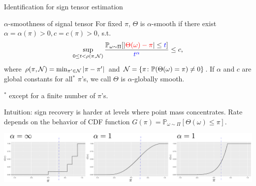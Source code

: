 \documentclass[10pt, mathserif]{beamer} %
\theoremstyle{definition}
\theoremstyle{plain}
\begin{document}
\begin{frame}{Identification for sign tensor estimation}
\begin{block}{$\alpha$-smoothness of signal tensor}
For fixed $\pi$, $\Theta$ is $\alpha$-smooth if there exist $\alpha = \alpha(\pi)>0,c = c(\pi)>0$, s.t.
\begin{align}
    \sup_{0\leq t<\rho(\pi,\mathcal{N})}{\mathbb{P}_{\omega\sim\Pi}[|{\color{red}\Theta(\omega)-\pi}|\leq {\color{blue}t}]\over {\color{blue}t^\alpha}}\leq c,
\end{align}
where $\rho(\pi,\mathcal{N}) = \min_{\pi'\in\mathcal{N}}|\pi-\pi'|$ and $\mathcal{N} = \{\pi\colon\mathbb{P}(\Theta(\omega) = \pi)\neq 0\}$.
If $\alpha$ and $c$ are global constants for all$^*$ $\pi$'s, we call $\Theta$ is $\alpha$-globally smooth.
\end{block}
 \vspace{-.4cm}
 {\hfill \tiny $^*$ except for a finite number of $\pi$'s. }
 \vspace{-.2cm} 
 
 \pause
Intuition: {\color{red}sign recovery} is harder at {\color{red}levels where point mass concentrates}. 
Rate depends on the behavior of CDF function $G(\pi)=\mathbb{P}_{\omega\sim \Pi}[\Theta(\omega)\leq \pi]$. 
 \begin{center}
 \includegraphics[width = \textwidth]{Figures/cdf_new.pdf}
 \end{center}
\end{frame}
\end{document}
